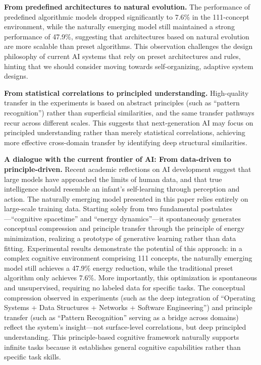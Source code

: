 \documentclass[10pt,onecolumn]{article}
\begin{document}
\textbf{From predefined architectures to natural evolution.} The performance of predefined algorithmic models dropped significantly to 7.6\% in the 111-concept environment, while the naturally emerging model still maintained a strong performance of 47.9\%, suggesting that architectures based on natural evolution are more scalable than preset algorithms. This observation challenges the design philosophy of current AI systems that rely on preset architectures and rules, hinting that we should consider moving towards self-organizing, adaptive system designs.

\textbf{From statistical correlations to principled understanding.} High-quality transfer in the experiments is based on abstract principles (such as “pattern recognition”) rather than superficial similarities, and the same transfer pathways recur across different scales. This suggests that next-generation AI may focus on principled understanding rather than merely statistical correlations, achieving more effective cross-domain transfer by identifying deep structural similarities.

\textbf{A dialogue with the current frontier of AI: From data-driven to principle-driven.} Recent academic reflections on AI development suggest that large models have approached the limits of human data, and that true intelligence should resemble an infant’s self-learning through perception and action. The naturally emerging model presented in this paper relies entirely on large-scale training data. Starting solely from two fundamental postulates—“cognitive spacetime” and “energy dynamics”—it spontaneously generates conceptual compression and principle transfer through the principle of energy minimization, realizing a prototype of generative learning rather than data fitting. Experimental results demonstrate the potential of this approach: in a complex cognitive environment comprising 111 concepts, the naturally emerging model still achieves a 47.9\% energy reduction, while the traditional preset algorithm only achieves 7.6\%. More importantly, this optimization is spontaneous and unsupervised, requiring no labeled data for specific tasks. The conceptual compression observed in experiments (such as the deep integration of “Operating Systems + Data Structures + Networks + Software Engineering”) and principle transfer (such as “Pattern Recognition” serving as a bridge across domains) reflect the system’s insight—not surface-level correlations, but deep principled understanding. This principle-based cognitive framework naturally supports infinite tasks because it establishes general cognitive capabilities rather than specific task skills.
\end{document}
